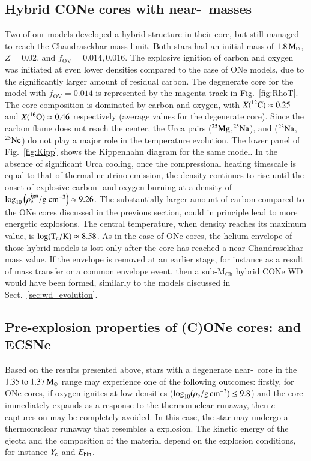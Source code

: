 \documentclass[main.tex]{subfiles}
\begin{document}
\subsection{Hybrid CONe cores with near-\mch\ masses}\label{sec:cone_core_evolution}
Two of our \seriesone models developed a hybrid 
structure in their core, but still managed to reach 
the Chandrasekhar-mass limit. Both stars had an 
initial mass of $1.8\msun$,  $Z = 0.02$, and 
$f_\text{OV} = 0.014, 0.016$. The explosive 
ignition of carbon and oxygen was initiated at even
lower densities  compared to the case of 
ONe models, due to the significantly larger amount
of residual carbon. The degenerate core for the model with $f_{\text{OV}} = 0.014$
is represented by the magenta track in Fig.~\ref{fig:RhoT}. The core composition is dominated by  carbon and oxygen, 
with $X(\iso{C}{12}) \approx 0.25$ and 
$X(\iso{O}{16}) \approx 0.46$ respectively (average values for the degenerate core). Since the carbon flame does not reach the center, the Urca pairs ($\rm ^{25}Mg$,$\rm ^{25}Na$), and ($\rm ^{23}Na$,$\rm ^{23}Ne$) do not play a major role in the temperature evolution. 
The lower panel of Fig.~\ref{fig:Kipp} shows the Kippenhahn diagram for 
the same model. In the absence of significant Urca cooling, once the 
compressional heating timescale is equal to that  of thermal neutrino 
emission, the density continues to rise until the onset of explosive 
carbon- and oxygen burning at a density of $\rm \log_{10} 
\left(\rho_c^{\rm ign} / \rm g \ cm^{-3} \right) \approx 9.26$. The 
substantially larger amount of carbon compared to the 
ONe cores discussed in the previous section, could in principle lead to more energetic 
explosions. The central temperature, when density reaches its maximum 
value, is $\rm \log(T_c / \rm K) \approx 8.58$.
As in the case of ONe cores, the helium envelope of those hybrid models 
is lost only after the core has reached a near-Chandrasekhar mass value. 
If the envelope is removed at an earlier stage, for instance as a result of mass transfer or a common envelope event, then a sub-M$_{\text{Ch}}$ 
hybrid CONe WD would have been formed, similarly to the models   
discussed in Sect.~\ref{sec:wd_evolution}.


\subsection{Pre-explosion properties of (C)ONe cores: \ias and ECSNe}\label{sec:explosion_properties} 
Based on the results presented  above, stars with a degenerate near-\mch\ core in the $\numrange{1.35}{1.37}\msun$ range may experience one of the following outcomes: firstly, for ONe cores, if oxygen ignites at low densities ($\logrhoc \lesssim 9.8$) and the core immediately expands as a response to the thermonuclear runaway, then $e$-captures on  may be completely avoided. In this case, the star may  undergo a thermonuclear runaway that resembles a \ia explosion. The kinetic energy of the ejecta and the composition of the material  depend on the explosion conditions, for instance $Y_{\rm e}$ and $E_{\rm bin}$.
\end{document}
